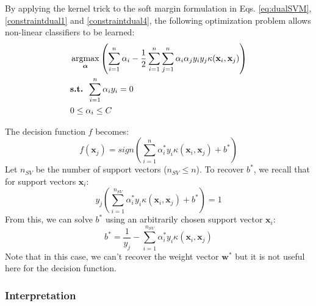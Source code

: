 By applying the kernel trick to the soft margin formulation in Eqs. \ref{eq:dualSVM}, \ref{constraintdual1} and \ref{constraintdual4}, the following optimization problem allows non-linear classifiers to be learned:
\begin{align}
	& \argmax_{\boldsymbol{\alpha}} \left( 
	\sum\limits_{i=1}^{n} \alpha_i - \frac{1}{2} \sum\limits_{i=1}^{n} \sum\limits_{j=1}^{n} \alpha_i \alpha_j y_i y_j \kappa(\textbf{x}_i , \textbf{x}_j) 
	\right) 
	\label{eq:dualSVM2kernel}\\
	& \textbf{s.t. } \sum\limits_{i=1}^{n}\alpha_i y_i = 0 \label{constraintdual3kernel}\\
	& 0 \leq \alpha_i \leq C  \label{constraintdual4kernel}
\end{align}

\noindent The decision function $f$ becomes:
\begin{equation}
f(\textbf{x}_j) = sign\left( \sum\limits_{i=1}^{n} \alpha_i^*y_i \kappa(\textbf{x}_i,\textbf{x}_j) + b^*\right)  \label{decisionDualKernel}
\end{equation} 
\noindent Let $n_{SV}$ be the number of support vectors ($n_{SV} \leq n$). To recover $b^*$, we recall that for support vectors $\textbf{x}_i$:
\begin{equation}
	y_j \left( \sum\limits_{i=1}^{n_{SV}} \alpha_i^* y_i \kappa(\textbf{x}_i,\textbf{x}_j) + b^* \right) = 1
\end{equation}
From this, we can solve $b^*$ using an arbitrarily chosen support vector $\textbf{x}_i$:
\begin{equation}
	b^* = \frac{1}{y_j} - \sum\limits_{i=1}^{n_{SV}} \alpha_i^* y_i \kappa(\textbf{x}_i,\textbf{x}_j)
\end{equation}
\noindent Note that in this case, we can't recover the weight vector $\textbf{w}^*$ but it is not useful here for the decision function.

\subsubsection{Interpretation}
\label{subsec:interpretation}

